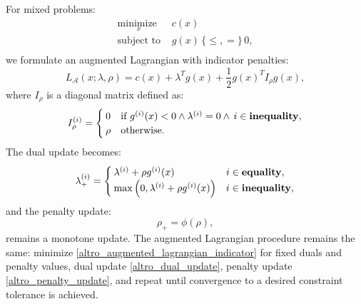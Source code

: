 For mixed problems:
\begin{equation}
	\begin{array}{ll}
		\underset{x}{\mbox{minimize }}  & c(x) \\
		\mbox{subject to } & g(x) \, \{\leq,=\}\, 0, \\
	\end{array}
	\label{altro_equality_inequality_constrained}
\end{equation}
we formulate an augmented Lagrangian with indicator penalties:
\begin{equation}
L_{\mathcal{A}}(x; \lambda, \rho) = c(x) + \lambda^T g(x)  +\frac{1}{2}g(x)^T I_{\rho} g(x), \label{altro_augmented_lagrangian_indicator}
\end{equation}
where $I_{\rho}$ is a diagonal matrix defined as:
\begin{equation}
	I_{\rho}^{(i)} = 
	\begin{cases} 
		0 & \text{if } g^{(i)}(x) < 0 \land \lambda^{(i)} = 0 \land \, i \in \mbox{\textbf{inequality}},\\
		\rho & \text{otherwise} .
	\end{cases}
\end{equation}
The dual update becomes:
\begin{equation}\label{altro_dual_update}
	\lambda_{+}^{(i)} = \begin{cases}
		\lambda^{(i)} + \rho g^{(i)}(x) & i \in \mbox{\textbf{equality}}, \\
		\max \Big(0, \lambda^{(i)} + \rho g^{(i)}(x)\Big) & i \in \mbox{\textbf{inequality}},
	\end{cases}
\end{equation} 
and the penalty update:
\begin{equation}\label{altro_penalty_update}
	\rho_{+} = \phi(\rho),
\end{equation}
remains a monotone update. The augmented Lagrangian procedure remains the same: minimize \eqref{altro_augmented_lagrangian_indicator} for fixed duals and penalty values, dual update \eqref{altro_dual_update}, penalty update \eqref{altro_penalty_update}, and repeat until convergence to a desired constraint tolerance is achieved.

